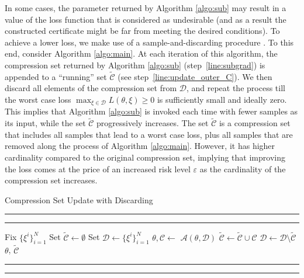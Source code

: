 In some cases, the parameter returned by Algorithm \ref{algo:sub} may result in a value of the loss function that is considered as undesirable (and as a result the constructed certificate might be far from meeting the desired conditions). 
To achieve a lower loss, we make use of a sample-and-discarding procedure \cite{DBLP:journals/jota/CampiG11,DBLP:journals/tac/RomaoPM23}.
To this end, consider Algorithm \ref{algo:main}. At each iteration of this algorithm, the compression set returned by Algorithm \ref{algo:sub} (step~\ref{line:subgrad}) is appended to a ``running'' set $\widetilde{\mathcal{C}}$ (see step~\ref{line:update_outer_C}). 
We then discard all elements of the compression set from $\mathcal{D}$, and repeat the process till the worst case loss $\max_{\xi \in \mathcal{D}} L(\theta, \xi)\geq0$ is sufficiently small and ideally zero. 
This implies that Algorithm \ref{algo:sub} is invoked each time with fewer samples as its input, while the set $\widetilde{\mathcal{C}}$ progressively increases.
The set $\widetilde{\mathcal{C}}$ is a compression set that includes all samples that lead to a worst case loss, plus all
samples that are removed along the process of Algorithm \ref{algo:main}.
However, it has higher cardinality compared to the original compression set, implying that improving the loss comes at the price of an increased risk level $\varepsilon$ as the cardinality of the compression set increases.

\begin{algorithm}[ht]
\caption{Compression Set Update with Discarding}
\vspace{0.2cm}
\label{algo:main}
\hrule \vspace{0.05cm} \hrule \vspace{0.1cm}
\begin{algorithmic}[1]
\State Fix $ \{\xi^i\}_{i=1}^N$
    \State Set $\widetilde{\mathcal{C}}\gets \emptyset$
    \State Set $\mathcal{D} \gets \{\xi^i\}_{i=1}^N$ 
            \State $\theta, \mathcal{C} \gets$ $\mathcal{A}(\theta,\mathcal{D})$  \label{line:subgrad}
        \State $\widetilde{\mathcal{C}} \gets \widetilde{\mathcal{C}} \cup \mathcal{C}$  \label{line:update_outer_C}
        \State  $\mathcal{D} \gets \mathcal{D} \setminus \widetilde{\mathcal{C}}$  \label{line:discard}
    \EndWhile
        \State \Return $\theta$, $\widetilde{\mathcal{C}}$
\end{algorithmic}
\vspace{0.1cm}
\hrule \vspace{0.05cm} \hrule 
\end{algorithm}

